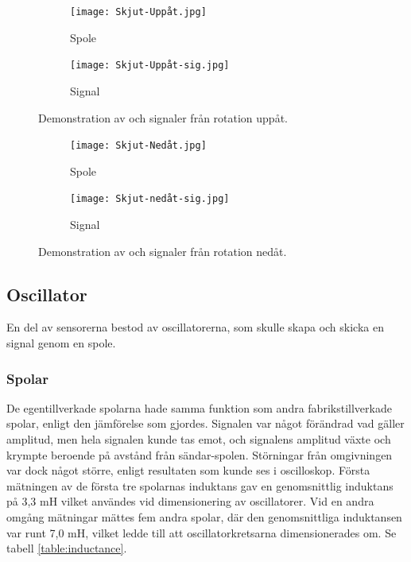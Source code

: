 \documentclass[a4paper]{article}
\makeatletter
\let\\\@raggedtwoe@savedcr%
\makeatother
\begin{document}
\begin{sloppypar}
    \begin{figure}[H]
        \centering
        \begin{subfigure}[b]{0.45\textwidth}
            \centering
            \texttt{[image: Skjut-Uppåt.jpg]}
            \caption{Spole}
            \label{fig:spole-uppåt}

        \end{subfigure}
        \hfill
        \begin{subfigure}[b]{0.45\textwidth}
            \centering
            \texttt{[image: Skjut-Uppåt-sig.jpg]}
            \caption{Signal}
            \label{fig:signal-uppåt}
        \end{subfigure}
        \caption{Demonstration av och signaler från rotation uppåt.}
        \label{fig:demo-uppåt}
    \end{figure}
    \begin{figure}[H]
        \centering
        \begin{subfigure}[b]{0.45\textwidth}
            \centering
            \texttt{[image: Skjut-Nedåt.jpg]}
            \caption{Spole}
            \label{fig:spole-nedåt}
        \end{subfigure}
        \hfill
        \begin{subfigure}[b]{0.45\textwidth}
            \centering
            \texttt{[image: Skjut-nedåt-sig.jpg]}
            \caption{Signal}
            \label{fig:signal-nedåt}
        \end{subfigure}
        \caption{Demonstration av och signaler från rotation nedåt.}
        \label{fig:demo-nedåt}
    \end{figure}
    \noindent




    \subsection{Oscillator}
    En del av sensorerna bestod av oscillatorerna, som skulle skapa och skicka en signal genom en spole.
    \subsubsection{Spolar}
    De egentillverkade spolarna hade samma funktion som andra fabrikstillverkade spolar, enligt den jämförelse som gjordes.
    Signalen var något förändrad vad gäller amplitud, men hela signalen kunde tas emot, och signalens amplitud växte och krympte beroende på avstånd från sändar-spolen.
    Störningar från omgivningen var dock något större, enligt resultaten som kunde ses i oscilloskop.
    \\\\
    Första mätningen av de första tre spolarnas induktans gav en genomsnittlig induktans på 3,3 mH vilket användes vid dimensionering av oscillatorer.
    Vid en andra omgång mätningar mättes fem andra spolar, där den genomsnittliga induktansen var runt 7,0 mH, vilket ledde till att oscillatorkretsarna dimensionerades om. Se tabell \ref{table:inductance}.


\end{sloppypar}
\end{document}
